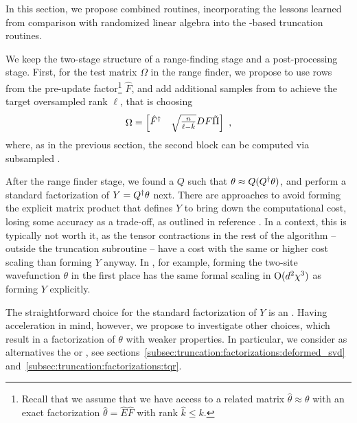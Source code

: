 In this section, we propose combined routines, incorporating the lessons learned from comparison with randomized linear algebra into the -based truncation routines.

We keep the two-stage structure of a range-finding stage and a post-processing stage.
%
First, for the test matrix $\Omega$ in the range finder, we propose to use rows from the pre-update factor\footnote{
    Recall that we assume that we have access to a related matrix $\hat\theta \approx \theta$
    with an exact factorization $\hat\theta = \hat{E} \hat{F}$ with rank $\hat k \leq k$.
} $\hat F$, and add additional samples from  to achieve the target oversampled rank $\ell$, that is choosing 
\begin{equation}
    \label{eq:truncation:synthesized_range_finder}
    \Omega = \begin{bmatrix} \hat{F}^\dagger & \sqrt{\frac{n}{\ell - \hat{k}}} D F \tilde\Pi\end{bmatrix}
    ~,
\end{equation}
where, as in the previous section, the second block can be computed via subsampled .

After the range finder stage, we found a $Q$ such that $\theta \approx Q(Q^\dagger\theta)$, and perform a standard factorization of $Y = Q^\dagger\theta$ next.
%
There are approaches to avoid forming the explicit matrix product that defines $Y$ to bring down the computational cost, losing some accuracy as a trade-off, as outlined in reference \cite[section 5.2]{halko2010}.
%
In a  context, this is typically not worth it, as the tensor contractions in the rest of the algorithm -- outside the truncation subroutine -- have a cost with the same or higher cost scaling than forming $Y$ anyway.
%
In , for example, forming the two-site wavefunction $\theta$ in the first place has the same formal scaling in $\mathrm{O}(d^2 \chi^3)$ as forming $Y$ explicitly.

The straightforward choice for the standard factorization of $Y$ is an .
%
Having  acceleration in mind, however, we propose to investigate other choices, which result in a factorization of $\theta$ with weaker properties.
%
In particular, we consider as alternatives the  or , see sections~\ref{subsec:truncation:factorizations:deformed_svd} and~\ref{subsec:truncation:factorizations:tqr}.

